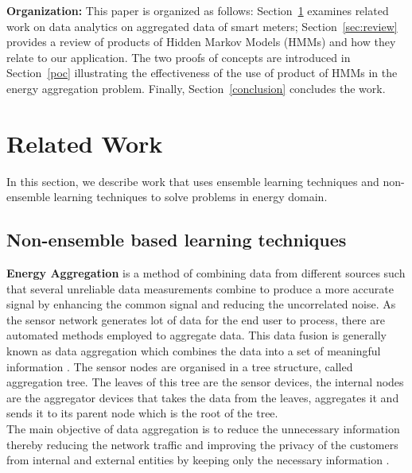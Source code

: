 \documentclass{acm_proc_article-sp}
\begin{document}
\noindent \textbf{Organization:} This paper is organized as follows: Section~\ref{related} examines related work on data analytics on aggregated data of smart meters; Section~\ref{sec:review} provides a review of products of Hidden Markov Models (HMMs) and how they relate to our application. The two proofs of concepts are introduced in Section~\ref{poc} illustrating the effectiveness of the use of product of HMMs in the energy aggregation problem. Finally, Section~\ref{conclusion} concludes the work.

\section{Related Work}
\label{related}
In this section, we describe work that uses ensemble learning techniques and non-ensemble learning techniques to solve problems in energy domain.
\subsection{Non-ensemble based learning techniques}


\noindent \textbf{Energy Aggregation}
is a method of combining data from different sources such that several unreliable data measurements combine to produce a more accurate signal by enhancing the common signal and reducing the uncorrelated noise. As the sensor network generates lot of data for the end user to process, there are automated methods employed to aggregate data. This data fusion is generally known as data aggregation which combines the data into a set of meaningful information \cite{Heinzelman00energy}.
The sensor nodes are organised in a tree structure, called aggregation tree. The leaves of this tree are the sensor devices, the internal nodes are the aggregator devices that takes the data from the leaves, aggregates it and sends it to its parent node which is the root of the tree. \\
The main objective of data aggregation is to reduce the unnecessary information thereby reducing the network traffic and improving the privacy of the customers from internal and external entities by keeping only the necessary information \cite{taban}. 


\end{document}
